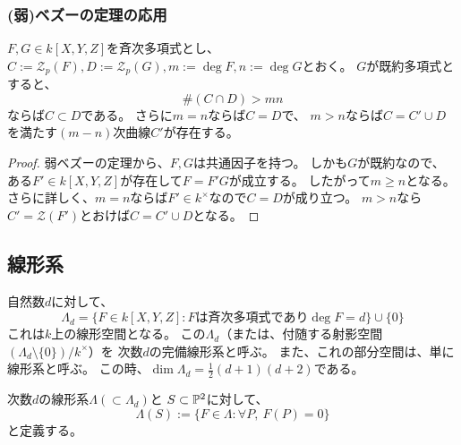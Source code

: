 \documentclass[a4paper]{jsarticle}
\begin{document}
    \subsubsection{(弱)ベズーの定理の応用}
    \begin{Prop}
        $F,G \in k[X,Y,Z]$を斉次多項式とし、
        $C:=\mathcal{Z}_p(F),D:=\mathcal{Z}_p(G),
        m:=\deg F, n:=\deg G$とおく。
        $G$が既約多項式とすると、
        \[ \#(C \cap D) > mn \]
        ならば$C \subset D$である。
        さらに$m=n$ならば$C=D$で、
        $m>n$ならば$C=C' \cup D$を満たす$(m-n)$次曲線$C'$が存在する。
    \end{Prop}
    \begin{proof}
        弱ベズーの定理から、$F,G$は共通因子を持つ。
        しかも$G$が既約なので、
        ある$F' \in k[X,Y,Z]$が存在して$F=F'G$が成立する。
        したがって$m \geq n$となる。
        さらに詳しく、$m=n$ならば$F' \in k^{\times}$なので$C=D$が成り立つ。
        $m>n$なら$C'=\mathcal{Z}(F')$とおけば$C=C' \cup D$となる。
        
    \end{proof}

    \subsection{線形系}
    自然数$d$に対して、
    \[ \Lambda_d=\{ F \in k[X,Y,Z] : \mbox{$F$は斉次多項式であり$\deg F=d$} \} \cup \{ 0 \} \]
    これは$k$上の線形空間となる。
    この$\Lambda_d$（または、付随する射影空間$(\Lambda_d \setminus \{0\})/k^{\times}$）を
    次数$d$の完備線形系と呼ぶ。
    また、これの部分空間は、単に線形系と呼ぶ。
    この時、$\dim \Lambda_d=\frac{1}{2}(d+1)(d+2)$である。

    次数$d$の線形系$\Lambda(\subset \Lambda_d)$と
    $S \subset \mathbb{P}^2$に対して、
    \[ \Lambda(S):=\{ F \in \Lambda : \forall P,~F(P)=0 \} \]
    と定義する。
\end{document}
